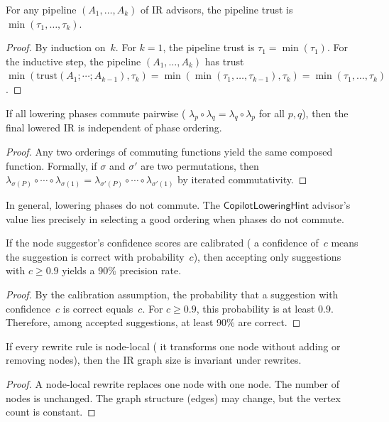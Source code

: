 \documentclass[11pt]{article}
\newcommand{\LowHint}{\mathsf{CopilotLoweringHint}}
\begin{document}
\begin{lemma}%
\label{lem:pipetrust}
For any pipeline $(A_1, \ldots, A_k)$ of IR advisors, the
pipeline trust is $\min(\tau_1, \ldots, \tau_k)$.
\end{lemma}
\begin{proof}
By induction on~$k$.  For $k = 1$, the pipeline trust is
$\tau_1 = \min(\tau_1)$.  For the inductive step, the
pipeline $(A_1, \ldots, A_k)$ has trust
$\min(\mathrm{trust}(A_1 \mathbin{;} \cdots \mathbin{;}
A_{k-1}), \tau_k) = \min(\min(\tau_1, \ldots, \tau_{k-1}),
\tau_k) = \min(\tau_1, \ldots, \tau_k)$.
\end{proof}

\begin{lemma}%
\label{lem:phaseorderindep}
If all lowering phases commute pairwise (\ie{}
$\lambda_p \circ \lambda_q = \lambda_q \circ \lambda_p$
for all $p, q$), then the final lowered IR is independent
of phase ordering.
\end{lemma}
\begin{proof}
Any two orderings of commuting functions yield the same
composed function.  Formally, if $\sigma$ and $\sigma'$
are two permutations, then
$\lambda_{\sigma(P)} \circ \cdots \circ \lambda_{\sigma(1)}
= \lambda_{\sigma'(P)} \circ \cdots \circ \lambda_{\sigma'(1)}$
by iterated commutativity.
\end{proof}

\begin{remark}
In general, lowering phases do not commute.  The
$\LowHint$ advisor's value lies precisely in selecting
a good ordering when phases do not commute.
\end{remark}

\begin{lemma}%
\label{lem:confcalib}
If the node suggestor's confidence scores are calibrated
(\ie{} a confidence of~$c$ means the suggestion is correct
with probability~$c$), then accepting only suggestions with
$c \geq 0.9$ yields a 90\% precision rate.
\end{lemma}
\begin{proof}
By the calibration assumption, the probability that a
suggestion with confidence~$c$ is correct equals~$c$.
For $c \geq 0.9$, this probability is at least 0.9.
Therefore, among accepted suggestions, at least 90\%
are correct.
\end{proof}

\begin{lemma}%
\label{lem:irgraphbound}
If every rewrite rule is node-local (\ie{} it transforms
one node without adding or removing nodes), then the IR
graph size is invariant under rewrites.
\end{lemma}
\begin{proof}
A node-local rewrite replaces one node with one node.
The number of nodes is unchanged.  The graph structure
(edges) may change, but the vertex count is constant.
\end{proof}
\end{document}
